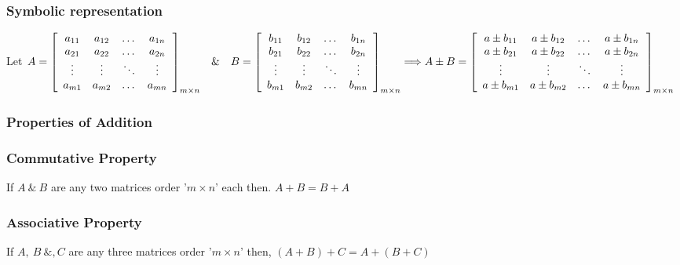 \documentclass{article}
\begin{document}
	\subsubsection{Symbolic representation}
	Let $ A = { \left[ \begin{array}{cccc}
		a_{11} & a_{12} & \dots & a_{1n} \\
		a_{21} & a_{22} & \dots & a_{2n} \\
		\vdots & \vdots & \ddots & \vdots \\
		a_{m1} & a_{m2} & \dots & a_{mn} \\
	\end{array}\right] }_{m \times n}
	~~~ \& ~~~
	B = { \left[ \begin{array}{cccc}
		b_{11} & b_{12} & \dots & b_{1n} \\
		b_{21} & b_{22} & \dots & b_{2n} \\
		\vdots & \vdots & \ddots & \vdots \\
		b_{m1} & b_{m2} & \dots & b_{mn} \\
	\end{array}\right] }_{m \times n} \\ \\ \\
	\Longrightarrow A \pm B = { \left[ \begin{array}{cccc}
			{a \pm b}_{11} & {a \pm b}_{12} & \dots & {a \pm b}_{1n} \\
			{a \pm b}_{21} & {a \pm b}_{22} & \dots & {a \pm b}_{2n} \\
			\vdots & \vdots & \ddots & \vdots \\
			{a \pm b}_{m1} & {a \pm b}_{m2} & \dots & {a \pm b}_{mn} \\
		\end{array}\right] }_{m \times n}$
	
	\subsubsection{Properties of Addition}
	\subsubsection*{Commutative Property}
	If $ A~\&~B $ are any two matrices order '$ m \times n $' each then. $ A+B = B+A $
	
	\subsubsection*{Associative Property}
	If $ A,~B~\& , C $ are any three matrices order '$ m \times n $' then, $ (A+B)+C = A+(B+C) $
	
\end{document}
